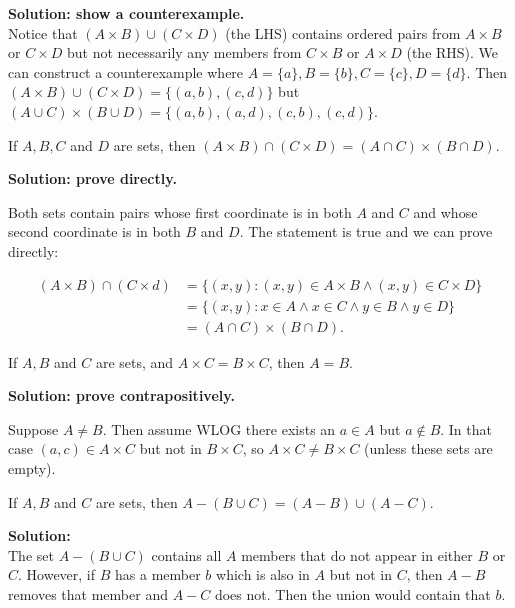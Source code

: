 \documentclass{article}
\begin{document}
\textbf{Solution: show a counterexample.}
\\
Notice that $(A \times B) \cup (C \times D)$ (the LHS) contains ordered pairs from $A \times B$ or $C \times D$ but not necessarily any members from $C \times B$ or $A \times D$ (the RHS). We can construct a counterexample where $A = \{a\}, B = \{b\}, C = \{c\}, D = \{d\}$. Then $(A \times B) \cup (C \times D) = \{(a, b), (c, d)\}$ but $(A \cup C) \times (B \cup D) = \{(a, b), (a, d), (c, b), (c, d)\}$.

\begin{problem}
If $A, B, C$ and $D$ are sets, then $(A \times B) \cap (C \times D) = (A \cap C) \times (B \cap D)$.
\end{problem}

\textbf{Solution: prove directly.}

Both sets contain pairs whose first coordinate is in both $A$ and $C$ and whose second coordinate is in both $B$ and $D$. The statement is true and we can prove directly:

\begin{align*}
    (A \times B) \cap (C \times d) & = \{(x, y): (x, y) \in A \times B \land (x, y) \in C \times D\} \\
                                   & = \{(x, y): x \in A \land x \in C \land y \in B \land y \in D\} \\
                                   & = (A \cap C) \times (B \cap D).
\end{align*}

\begin{problem}
If $A, B$ and $C$ are sets, and $A \times C = B \times C$, then $A = B$.
\end{problem}

\textbf{Solution: prove contrapositively.}

Suppose $A \neq B$. Then assume WLOG there exists an $a \in A$ but $a \not\in B$. In that case $(a, c) \in A \times C$ but not in $B \times C$, so $A \times C \neq B \times C$ (unless these sets are empty).

\begin{problem}
If $A, B$ and $C$ are sets, then $A - (B \cup C) = (A - B) \cup (A - C)$.
\end{problem}

\textbf{Solution:}
\\
The set $A - (B\cup C)$ contains all $A$ members that do not appear in either $B$ or $C$. However, if $B$ has a member $b$ which is also in $A$ but not in $C$, then $A - B$ removes that member and $A - C$ does not. Then the union would contain that $b$.
\end{document}
